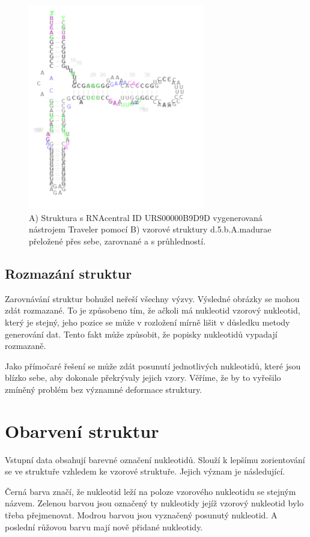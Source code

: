 \begin{figure}[H]
  \centering
  \includegraphics[height=90mm]{../img/kap02/align/aligned.png}
  \caption{A) Struktura s RNAcentral ID URS00000B9D9D vygenerovaná nástrojem
  Traveler pomocí B) vzorové struktury d.5.b.A.madurae přeložené přes sebe,
  zarovnané a s průhledností.}
\end{figure}

\subsection{Rozmazání struktur}

Zarovnávání struktur bohužel neřeší všechny výzvy. Výsledné obrázky se mohou
zdát rozmazané. To je způsobeno tím, že ačkoli má nukleotid vzorový nukleotid,
který je stejný, jeho pozice se může v rozložení mírně lišit v důsledku metody
generování dat. Tento fakt může způsobit, že popisky nukleotidů vypadají
rozmazaně.

Jako přímočaré řešení se může zdát posunutí jednotlivých nukleotidů, které jsou
blízko sebe, aby dokonale překrývaly jejich vzory. Věříme, že by to vyřešilo
zmíněný problém bez významné deformace struktury.

\section{Obarvení struktur}

Vstupní data obsahují barevné označení nukleotidů. Slouží k lepšímu
zorientování se ve struktuře vzhledem ke vzorové struktuře. Jejich význam je
následující.

Černá barva značí, že nukleotid leží na poloze vzorového nukleotidu se stejným
názvem. Zelenou barvou jsou označený ty nukleotidy jejíž vzorový nukleotid bylo
třeba přejmenovat. Modrou barvou jsou vyznačený posunutý nukleotid. A poslední
růžovou barvu mají nově přidané nukleotidy.

